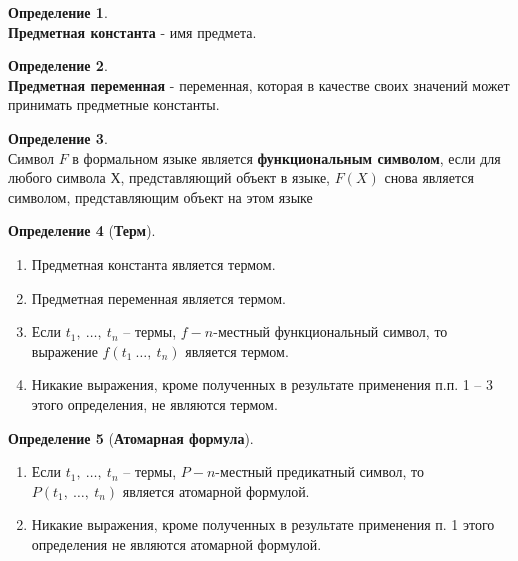 \documentclass[a4paper,12pt]{article}
\theoremstyle{definition} %
\newtheorem{definition}{Определение}[section]
\theoremstyle{definition} %
\theoremstyle{remark} %
\newcommand{\krs}[1]{\left(#1\right)}
\begin{document}
	\begin{definition} \ \\[1ex]
		\textbf{Предметная константа} - имя предмета.
	\end{definition}

	\begin{definition} \ \\[1ex]
		\textbf{Предметная переменная} - переменная, которая в качестве своих значений может принимать предметные константы.
	\end{definition}

	\begin{definition} \ \\[1ex]
		Символ $F$ в формальном языке является \textbf{функциональным символом}, если для любого символа $Х$, представляющий объект в языке, $F \krs{X}$ снова является символом, представляющим объект на этом языке
	\end{definition}

	\begin{definition}[\textbf{Терм}] \ \\
		\begin{enumerate}
			\item Предметная константа является термом.
			\item Предметная переменная является термом.
			\item Если $t_{1} , \ \dots , \ t_{n}$ -- термы, $f - n$-местный функциональный символ, то выражение $f \krs{t_{1} \ \dots , \ t_{n}}$ является термом.
			\item Никакие выражения, кроме полученных в результате применения п.п. 1 -- 3 этого определения, не являются термом.
		\end{enumerate}
	\end{definition}

	\begin{definition}[\textbf{Атомарная формула}] \
		\begin{enumerate}
			\item Если $t_{1} , \ \dots , \ t_{n}$ -- термы, $P - n$-местный предикатный символ, то $P \krs{t_{1}, \ \dots , \ t_{n}}$ является атомарной формулой.
			\item Никакие выражения, кроме полученных в результате применения п. 1 этого определения не являются атомарной формулой.
		\end{enumerate}
	\end{definition}
\end{document}

